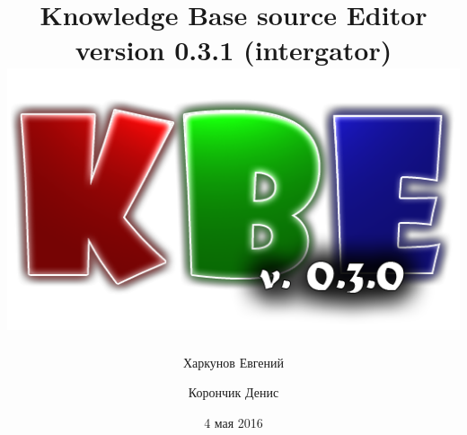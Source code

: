 \newpage
\title{
	\textcolor[rgb]{.67,.05,.05}{Knowledge} \textcolor[rgb]{.23,.62,.25}{Base} source \textcolor[rgb]{.11,.45,.86}{Editor} 					\\version 0.3.1 (intergator)
	\includegraphics[]{../images/title.png}
}
\author{Харкунов Евгений \and Корончик Денис}
\date{4 мая 2016}
\maketitle
